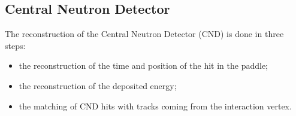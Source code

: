 \subsection{Central Neutron Detector}

The reconstruction of the Central Neutron Detector (CND) is done in three steps:

\begin{itemize}
\item{the reconstruction of the time and position of the hit in the paddle;}
\item{the reconstruction of the deposited energy;}
\item{the matching of CND hits with tracks coming from the interaction vertex.}
\end{itemize}

%

